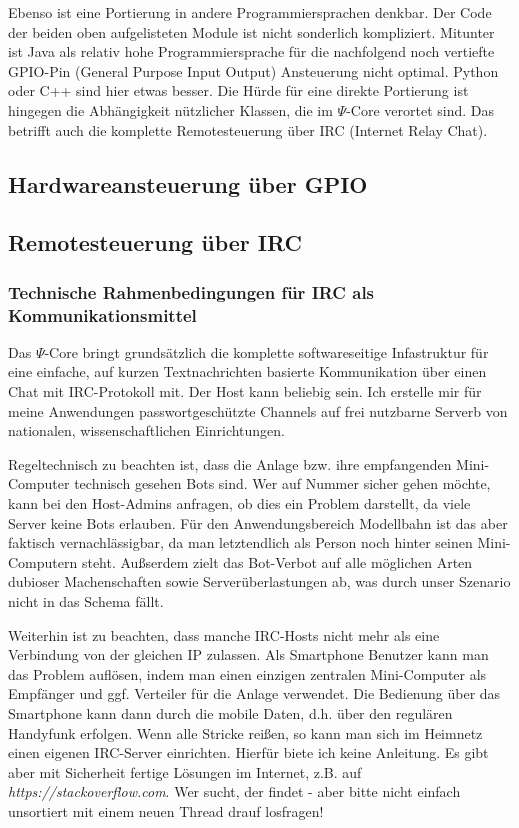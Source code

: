 Ebenso ist eine Portierung in andere Programmiersprachen denkbar.
Der Code der beiden oben aufgelisteten Module ist nicht sonderlich kompliziert.
Mitunter ist Java als relativ hohe Programmiersprache f\"ur die nachfolgend noch vertiefte GPIO-Pin (General Purpose Input Output) Ansteuerung nicht optimal.
Python oder C++ sind hier etwas besser.
Die H\"urde f\"ur eine direkte Portierung ist hingegen die Abh\"angigkeit n\"utzlicher Klassen, die im $\Psi$-Core verortet sind.
Das betrifft auch die komplette Remotesteuerung \"uber IRC (Internet Relay Chat).




\subsection{Hardwareansteuerung \"uber GPIO}
\label{sec:gpio}



\subsection{Remotesteuerung \"uber IRC}
\label{sec:remote_irc}

\subsubsection{Technische Rahmenbedingungen f\"ur IRC als Kommunikationsmittel}

Das $\Psi$-Core bringt grunds\"atzlich die komplette softwareseitige Infastruktur f\"ur eine einfache, auf kurzen Textnachrichten basierte Kommunikation \"uber einen Chat mit IRC-Protokoll mit.
Der Host kann beliebig sein.
Ich erstelle mir f\"ur meine Anwendungen passwortgesch\"utzte Channels auf frei nutzbarne Serverb von nationalen, wissenschaftlichen Einrichtungen.

Regeltechnisch zu beachten ist, dass die Anlage bzw. ihre empfangenden Mini-Computer technisch gesehen Bots sind.
Wer auf Nummer sicher gehen m\"ochte, kann bei den Host-Admins anfragen, ob dies ein Problem darstellt, da viele Server keine Bots erlauben.
F\"ur den Anwendungsbereich Modellbahn ist das aber faktisch vernachl\"assigbar, da man letztendlich als Person noch hinter seinen Mini-Computern steht.
Au{\ss}serdem zielt das Bot-Verbot auf alle m\"oglichen Arten dubioser Machenschaften sowie Server\"uberlastungen ab, was durch unser Szenario nicht in das Schema f\"allt.

Weiterhin ist zu beachten, dass manche IRC-Hosts nicht mehr als eine Verbindung von der gleichen IP zulassen.
Als Smartphone Benutzer kann man das Problem aufl\"osen, indem man einen einzigen zentralen Mini-Computer als Empf\"anger und ggf. Verteiler f\"ur die Anlage verwendet.
Die Bedienung \"uber das Smartphone kann dann durch die mobile Daten, d.h. \"uber den regul\"aren Handyfunk erfolgen.
Wenn alle Stricke rei{\ss}en, so kann man sich im Heimnetz einen eigenen IRC-Server einrichten.
Hierf\"ur biete ich keine Anleitung.
Es gibt aber mit Sicherheit fertige L\"osungen im Internet, z.B. auf \textit{https://stackoverflow.com}.
Wer sucht, der findet - aber bitte nicht einfach unsortiert mit einem neuen Thread drauf losfragen!

